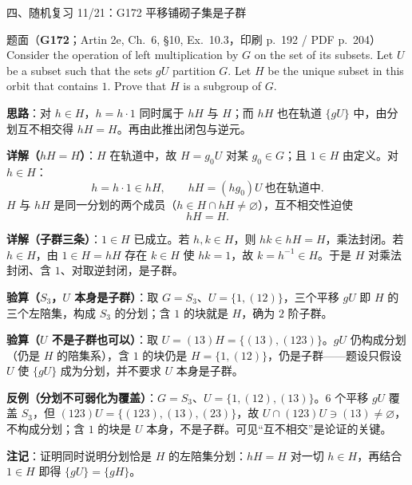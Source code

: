 \documentclass[aspectratio=169,10pt,fontset=none]{ctexbeamer}
\newcommand{\ex}[1]{\textcolor{accent}{\footnotesize\bfseries #1}}
\newcommand{\key}[1]{\textcolor{ink}{\bfseries #1}}
\begin{document}
\begin{frame}[t]{四、随机复习 11/21：G172 平移铺砌子集是子群}
\label{ex:G172}
\scriptsize
\begin{block}{\footnotesize 题面（\ex{G172}；Artin 2e, Ch.~6, §10, Ex.~10.3，印刷 p.~192 / PDF p.~204）}
Consider the operation of left multiplication by $G$ on the set of its subsets. Let $U$ be a subset such that the sets $gU$ partition $G$. Let $H$ be the unique subset in this orbit that contains $1$. Prove that $H$ is a subgroup of $G$.
\end{block}
\key{思路}：对 $h\in H$，$h=h\cdot1$ 同时属于 $hH$ 与 $H$；而 $hH$ 也在轨道 $\{gU\}$ 中，由分划互不相交得 $hH=H$。再由此推出闭包与逆元。

\key{详解（$hH=H$）}：$H$ 在轨道中，故 $H=g_0U$ 对某 $g_0\in G$；且 $1\in H$ 由定义。对 $h\in H$：
\[ h=h\cdot1\in hH,\qquad hH=(hg_0)U\ \text{也在轨道中}. \]
$H$ 与 $hH$ 是同一分划的两个成员（$h\in H\cap hH\ne\varnothing$），互不相交性迫使
\[ hH=H . \]

\key{详解（子群三条）}：$1\in H$ 已成立。若 $h,k\in H$，则 $hk\in hH=H$，乘法封闭。若 $h\in H$，由 $1\in H=hH$ 存在 $k\in H$ 使 $hk=1$，故 $k=h^{-1}\in H$。于是 $H$ 对乘法封闭、含 $1$、对取逆封闭，是子群。

\key{验算（$S_3$，$U$ 本身是子群）}：取 $G=S_3$、$U=\{1,(12)\}$，三个平移 $gU$ 即 $H$ 的三个左陪集，构成 $S_3$ 的分划；含 $1$ 的块就是 $H$，确为 $2$ 阶子群。

\key{验算（$U$ 不是子群也可以）}：取 $U=(13)H=\{(13),(123)\}$。$gU$ 仍构成分划（仍是 $H$ 的陪集系），含 $1$ 的块仍是 $H=\{1,(12)\}$，仍是子群——题设只假设 $U$ 使 $\{gU\}$ 成为分划，并不要求 $U$ 本身是子群。

\key{反例（分划不可弱化为覆盖）}：$G=S_3$、$U=\{1,(12),(13)\}$。$6$ 个平移 $gU$ 覆盖 $S_3$，但 $(123)U=\{(123),(13),(23)\}$，故 $U\cap(123)U\ni(13)\ne\varnothing$，不构成分划；含 $1$ 的块是 $U$ 本身，不是子群。可见“互不相交”是论证的关键。

\key{注记}：证明同时说明分划恰是 $H$ 的左陪集分划：$hH=H$ 对一切 $h\in H$，再结合 $1\in H$ 即得 $\{gU\}=\{gH\}$。
\end{frame}
\end{document}
